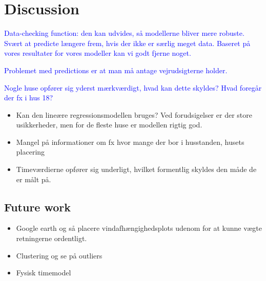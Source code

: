 \chapter{Discussion}
\label{chap: discussion}

\textcolor{blue}{Data-checking function: den kan udvides, så modellerne bliver mere robuste. Svært at predicte længere frem, hvis der ikke er særlig meget data. Baseret på vores resultater for vores modeller kan vi godt fjerne noget.} 

\textcolor{blue}{Problemet med predictions er at man må antage vejrudsigterne holder.} 

\textcolor{blue}{Nogle huse opfører sig yderst mærkværdigt, hvad kan dette skyldes? Hvad foregår der fx i hus 18?}

\begin{itemize}
    \item Kan den lineære regressionsmodellen bruges? Ved forudsigelser er der store usikkerheder, men for de fleste huse er modellen rigtig god. 
    \item Mangel på informationer om fx hvor mange der bor i husstanden, husets placering 
    \item Timeværdierne opfører sig underligt, hvilket formentlig skyldes den måde de er målt på. 
\end{itemize}

\section{Future work}
\begin{itemize}
    \item Google earth og så placere vindafhængighedsplots udenom for at kunne vægte retningerne ordentligt. 
    \item Clustering og se på outliers
    \item Fysisk timemodel 
\end{itemize}